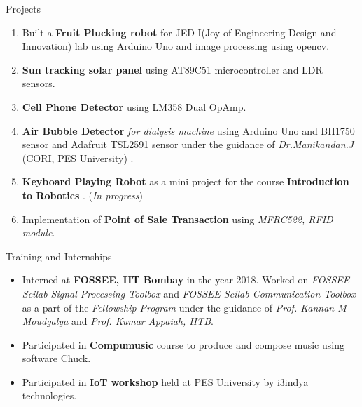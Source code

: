 \documentclass{resume} %
\begin{document}
\begin{rSection}{Projects}

\begin{enumerate}


\item Built a \textbf{Fruit Plucking robot} for JED-I(Joy of Engineering Design and Innovation) lab using Arduino Uno and image processing using
opencv.

\item \textbf{Sun tracking solar panel} using AT89C51 microcontroller and LDR sensors.

\item \textbf{Cell Phone Detector} using LM358 Dual OpAmp.

\item \textbf{Air Bubble Detector} \textit{for dialysis machine} using Arduino Uno and BH1750 sensor and Adafruit TSL2591 sensor under the guidance of \textit{Dr.Manikandan.J} (CORI, PES University) . 

\item \textbf{Keyboard Playing Robot} as a mini project for the course \textbf{Introduction to Robotics} . (\textit{In progress})

\item Implementation of \textbf{Point of Sale Transaction} using \textit{MFRC522, RFID module}.

\end{enumerate}
\end{rSection}

\vspace{1cm}






\begin{rSection}{Training and Internships}
\begin{itemize}
    \item Interned at \textbf{FOSSEE, IIT Bombay} in the year 2018.\newline
    Worked on \textit{FOSSEE-Scilab Signal Processing Toolbox} and \textit{FOSSEE-Scilab Communication Toolbox} as a part of the \textit{Fellowship Program} under the guidance of \textit{Prof. Kannan M Moudgalya} and \textit{Prof. Kumar Appaiah, IITB}.
    \item Participated in {\bf Compumusic} course to produce and compose music using software Chuck.
    \item Participated in {\bf IoT workshop} held at PES University by i3indya technologies.


\end{itemize}
\end{rSection}
\end{document}
